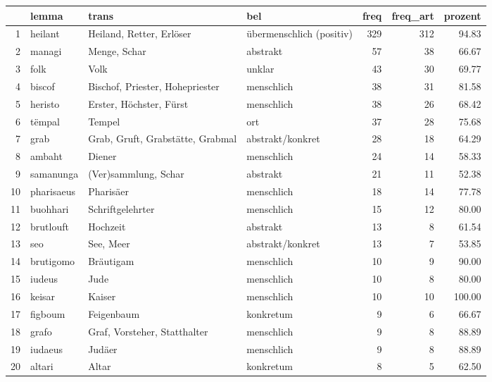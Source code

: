 \begin{tabular}{rlllrrr}
  \hline
 & lemma & trans & bel & freq & freq\_art & prozent \\ 
  \hline
1 & heilant & Heiland, Retter, Erlöser & übermenschlich (positiv) & 329 & 312 & 94.83 \\ 
  2 & managi & Menge, Schar & abstrakt &  57 &  38 & 66.67 \\ 
  3 & folk & Volk & unklar &  43 &  30 & 69.77 \\ 
  4 & biscof & Bischof, Priester, Hohepriester & menschlich &  38 &  31 & 81.58 \\ 
  5 & heristo & Erster, Höchster, Fürst & menschlich &  38 &  26 & 68.42 \\ 
  6 & tëmpal & Tempel & ort &  37 &  28 & 75.68 \\ 
  7 & grab & Grab, Gruft, Grabstätte, Grabmal & abstrakt/konkret &  28 &  18 & 64.29 \\ 
  8 & ambaht & Diener & menschlich &  24 &  14 & 58.33 \\ 
  9 & samanunga & (Ver)sammlung, Schar & abstrakt &  21 &  11 & 52.38 \\ 
  10 & pharisaeus & Pharisäer & menschlich &  18 &  14 & 77.78 \\ 
  11 & buohhari & Schriftgelehrter & menschlich &  15 &  12 & 80.00 \\ 
  12 & brutlouft & Hochzeit & abstrakt &  13 &   8 & 61.54 \\ 
  13 & seo & See, Meer & abstrakt/konkret &  13 &   7 & 53.85 \\ 
  14 & brutigomo & Bräutigam & menschlich &  10 &   9 & 90.00 \\ 
  15 & iudeus & Jude & menschlich &  10 &   8 & 80.00 \\ 
  16 & keisar & Kaiser & menschlich &  10 &  10 & 100.00 \\ 
  17 & figboum & Feigenbaum & konkretum &   9 &   6 & 66.67 \\ 
  18 & grafo & Graf, Vorsteher, Statthalter & menschlich &   9 &   8 & 88.89 \\ 
  19 & iudaeus & Judäer & menschlich &   9 &   8 & 88.89 \\ 
  20 & altari & Altar & konkretum &   8 &   5 & 62.50 \\ 
   \hline
\end{tabular}
